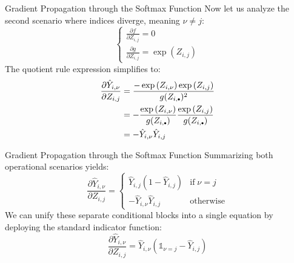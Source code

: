 \begin{frame}{Gradient Propagation through the Softmax Function}
	Now let us analyze the second scenario where indices diverge, meaning $\nu \ne j$:
	\begin{equation*}
	\begin{cases}
		\frac{\partial{f}}{\partial{Z_{i,j}}} = 0 \\
		\frac{\partial{g}}{\partial{Z_{i,j}}} = \exp{(Z_{i,j})}
	\end{cases}
	\end{equation*}
	\pause
	The quotient rule expression simplifies to:
	\begin{equation*}
		\begin{aligned}
			\frac{\partial{\hat{Y}_{i,\nu}}}{\partial{Z_{i,j}}}
			&= \frac{- \exp{(Z_{i,\nu})} \exp{(Z_{i,j})}}{g(Z_{i,\bigdot})^2} \\
			&= -\frac{\exp{(Z_{i,\nu})}}{g(Z_{i,\bigdot})} \frac{\exp{(Z_{i,j})}}{g(Z_{i,\bigdot})} \\
			&= - \hat{Y}_{i,\nu} \hat{Y}_{i,j}
		\end{aligned}
	\end{equation*}
\end{frame}

\begin{frame}{Gradient Propagation through the Softmax Function}
	Summarizing both operational scenarios yields:
	\begin{equation*}
		\frac{\partial{\hat{Y}_{i,\nu}}}{\partial{Z_{i,j}}} =
		\begin{cases}
			\hat{Y}_{i,j} \left(1 - \hat{Y}_{i,j}\right) & \text{if} \; \nu = j \\
			- \hat{Y}_{i,\nu} \hat{Y}_{i,j}              & \text{otherwise}
		\end{cases}
	\end{equation*}
	\pause
	We can unify these separate conditional blocks into a single equation by deploying the standard indicator function:
	\begin{equation*}
		\frac{\partial{\hat{Y}_{i,\nu}}}{\partial{Z_{i,j}}} = \hat{Y}_{i,\nu} \left(\mathbb{1}_{\nu=j} - \hat{Y}_{i,j}\right)
	\end{equation*}
\end{frame}

